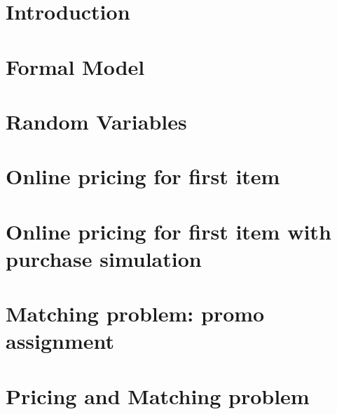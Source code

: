 
\usepackage{amsfonts}
\usepackage{amsmath}
\DeclareMathOperator{\argmax}{arg\,max}

	
	\tableofcontents
    \clearpage
	\section*{Introduction}
    \label{sect:Introduction}
		
    \section*{Formal Model}
    \label{sect:Formal Model}
		
    \section*{Random Variables}
    \label{sect:Random Variables}
			
    \section*{Online pricing for first item}
    \label{sect:Online pricing for first item}
		
    \section*{Online pricing for first item with purchase simulation}
    \label{sect:Online pricing for first item with purchase simulation}
		
    \section*{Matching problem: promo assignment}
    \label{sect:Matching problem: promo assignment}
		
    \section*{Pricing and Matching problem}
    \label{sect:Pricing and Matching problem}
		
